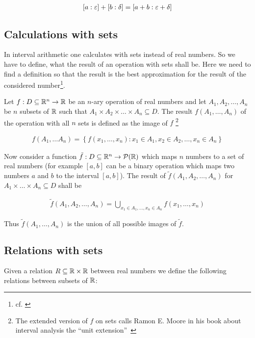 \begin{align}
  \an{a}+\an[\delta]{b} = \an[\epsilon+\delta]{a+b}
\end{align}

\subsection{Calculations with sets} \label{sec:calculations_sets}

In interval arithmetic one calculates with sets instead of real numbers. So we have to define, what the result of an operation with sets shall be. Here we need to find a definition so that the result is the best approximation for the result of the considered number\footnote{cf. \cite[pp. 17-18]{kulla}}.

Let $f:D\subseteq\R^n\to\R$ be an $n$-ary operation of real numbers and let $A_1,A_2,\ldots,A_n$ be $n$ subsets of $\R$ such that $A_1\times A_2\times \dots\times A_n\subseteq D$. The result  $f\left(A_1,\ldots,A_n\right)$ of the operation with all $n$ sets is defined as the image of $f$ \footnote{The extended version of $f$ on sets calls Ramon E. Moore in his book about interval analysis the ``unit extension''~\cite[p. 18]{moore}}

\begin{align}
  f\left(A_1,\ldots A_n\right)=\left\{f(x_1,\ldots,x_n):x_1\in A_1,x_2\in A_2,\ldots,x_n\in A_n\right\}
\end{align}

Now consider a function $\tilde f:D\subseteq\R^n\to \mathcal P(\R)$ which maps $n$ numbers to a set of real numbers (for example $[a,b]$ can be a binary operation which maps two numbers $a$ and $b$ to the interval $[a,b]$). The result of $\tilde f\left(A_1,A_2,\ldots,A_n\right)$ for $A_1\times\dots\times A_n\subseteq D$ shall be

\begin{align}
  \tilde f\left(A_1,A_2,\ldots,A_n\right) = \bigcup_{x_1\in A_1, \ldots, x_n \in A_n} f(x_1,\ldots,x_n)
\end{align}

\noindent Thus $\tilde f(A_1,\ldots,A_n)$ is the union of all possible images of $\tilde f$.

\subsection{Relations with sets}

Given a relation $R \subseteq \R \times \R$ between real numbers we define the following relations between subsets of $\R$:

